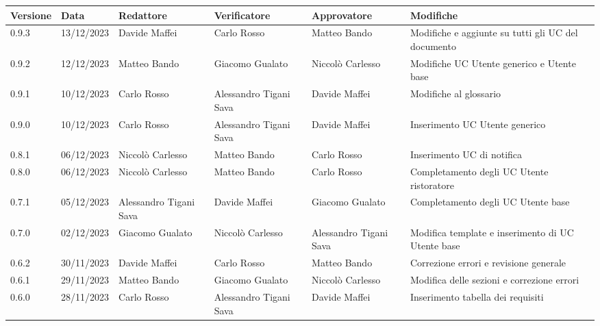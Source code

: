 \begin{table}[H]
	\centering
	\fontsize{10}{12}\selectfont
	\begin{tabularx}{\textwidth}{X|X|X|X|X|X}
		\textbf{Versione}     & \textbf{Data}        & \textbf{Redattore}     &
		\textbf{Verificatore} & \textbf{Approvatore} & \textbf{Modifiche}                                                                                                    \\
		\toprule
		0.9.3                 & 13/12/2023           & Davide Maffei          & Carlo Rosso            & Matteo Bando       	& Modifiche e aggiunte su tutti gli UC del documento                                   \\
		\hline
		0.9.2                 & 12/12/2023           & Matteo Bando           & Giacomo Gualato        & Niccolò Carlesso       & Modifiche UC Utente generico e Utente base                                     \\
		\hline
		0.9.1                 & 10/12/2023           & Carlo Rosso            & Alessandro Tigani Sava & Davide Maffei          & Modifiche al glossario                                     \\
		\hline
		0.9.0                 & 10/12/2023           & Carlo Rosso            & Alessandro Tigani Sava & Davide Maffei          & Inserimento UC Utente generico                             \\
		\hline
		0.8.1                 & 06/12/2023           & Niccolò Carlesso       & Matteo Bando           & Carlo Rosso            & Inserimento UC di notifica                                 \\
		\hline
		0.8.0                 & 06/12/2023           & Niccolò Carlesso       & Matteo Bando           & Carlo Rosso            & Completamento degli UC Utente ristoratore                  \\
		\hline
		0.7.1                 & 05/12/2023           & Alessandro Tigani Sava & Davide Maffei          & Giacomo Gualato        & Completamento degli UC Utente base                         \\
		\hline
		0.7.0                 & 02/12/2023           & Giacomo Gualato        & Niccolò Carlesso       & Alessandro Tigani Sava & Modifica template e inserimento di UC Utente base          \\
		\hline
		0.6.2                 & 30/11/2023           & Davide Maffei          & Carlo Rosso            & Matteo Bando           & Correzione errori e revisione generale                     \\
		\hline
		0.6.1                 & 29/11/2023           & Matteo Bando           & Giacomo Gualato        & Niccolò Carlesso       & Modifica delle sezioni e correzione errori                 \\
		\hline
		0.6.0                 & 28/11/2023           & Carlo Rosso            & Alessandro Tigani Sava & Davide Maffei          & Inserimento tabella dei requisiti                          \\
		\bottomrule
	\end{tabularx}
\end{table}


